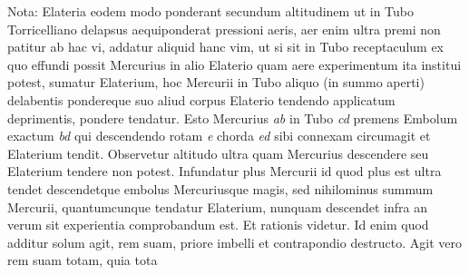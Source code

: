 \pstart  Nota: Elateria\protect{} eodem modo ponderant secundum  altitudinem ut  in Tubo Torricelliano\protect{} delapsus aequiponderat pressioni aeris\protect{}, aer enim  ultra premi non patitur ab hac vi, addatur aliquid hanc vim,  ut si sit in Tubo receptaculum ex quo effundi possit Mercurius\protect{}    in alio Elaterio\protect{} quam aere experimentum  ita institui potest, sumatur Elaterium\protect{}, hoc Mercurii\protect{}  in Tubo aliquo (in summo  aperti) delabentis pondereque\protect{} suo aliud corpus Elaterio\protect{} tendendo applicatum deprimentis, pondere\protect{} tendatur. Esto Mercurius\protect{} \textit{ab} in Tubo \textit{cd}  premens Embolum\protect{} exactum \textit{bd}  qui descendendo  rotam \textit{e} chorda \textit{ed} sibi connexam circumagit  et Elaterium\protect{} tendit. Observetur altitudo ultra quam Mercurius\protect{} descendere seu Elaterium\protect{} tendere non potest. Infundatur plus Mercurii\protect{} id quod plus est ultra tendet descendetque embolus\protect{} Mercuriusque\protect{} magis, sed nihilominus summum Mercurii\protect{}, quantumcunque tendatur Elaterium\protect{}, nunquam  descendet infra   an verum sit experientia comprobandum est. Et rationis  videtur. Id enim quod additur solum agit, rem  suam, priore imbelli et contrapondio destructo. Agit  vero rem suam totam, quia tota %
